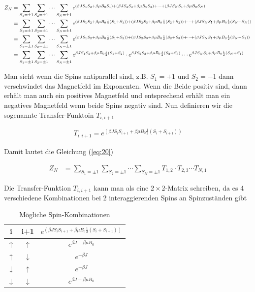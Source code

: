 \begin{align}
  \label{eq:20}
   Z_N &=\sum_{S_1=\pm 1}\sum_{S_2=\pm 1}\cdots \sum_{S_N=\pm 1} e^{(\beta J S_1 S_{2} + \beta \mu B_0 S_1) + (\beta J S_2 S_{3} + \beta \mu B_0 S_2) +\dots+ (\beta J S_N S_1 + \beta \mu B_0 S_N) } \notag\\
&=\sum_{S_1=\pm 1}\sum_{S_2=\pm 1}\cdots \sum_{S_N=\pm 1} e^{(\beta J S_1 S_{2} + \beta \mu B_0\frac{1}{2}(S_1+S_1)) + (\beta J S_2 S_{3} + \beta \mu B_0 \frac{1}{2}(S_2+S_2)) +\dots+ (\beta J S_N S_1 + \beta \mu B_0 \frac{1}{2}(S_N+S_N)) } \notag\\
&=\sum_{S_1=\pm 1}\sum_{S_2=\pm 1}\cdots \sum_{S_N=\pm 1} e^{(\beta J S_1 S_{2} + \beta \mu B_0\frac{1}{2}(S_1+S_2)) + (\beta J S_2 S_{3} + \beta \mu B_0 \frac{1}{2}(S_2+S_3)) +\dots+ (\beta J S_N S_1 + \beta \mu B_0 \frac{1}{2}(S_N+S_1)) } \notag\\
&=\sum_{S_1=\pm 1}\sum_{S_2=\pm 1}\cdots \sum_{S_N=\pm 1} e^{\beta J S_1 S_{2} + \beta \mu B_0\frac{1}{2}(S_1+S_2)}\cdot e^{\beta J S_2 S_{3} + \beta \mu B_0 \frac{1}{2}(S_2+S_3)}\cdots e^{\beta J S_N S_1 + \beta \mu B_0 \frac{1}{2}(S_N+S_1) } \notag\\
\end{align}

Man sieht wenn die Spins antiparallel sind, z.B. \(S_1=+1\) und \(S_2=-1\) dann verschwindet das Magnetfeld im Exponenten. Wenn die Beide positiv sind, dann erhält man auch ein positives Magnetfeld und entsprechend erhält man ein negatives Magnetfeld wenn beide Spins negativ sind.  Nun definieren wir die sogenannte Transfer-Funktoin \(T_{i,i+1}\)

\begin{align}
  \label{eq:21}
  T_{i,i+1}= e^{(\beta J S_i S_{i+1} + \beta \mu B_0\frac{1}{2}(S_i+S_{i+1}))}
\end{align}

Damit lautet die Gleichung (\ref{eq:20})

\begin{align}
  \label{eq:22}
   Z_N &=\sum_{S_1=\pm 1}\sum_{S_2=\pm 1}\cdots \sum_{S_N=\pm 1} T_{1,2}\cdot T_{2,3}\cdots T_{N,1}
\end{align}

Die Transfer-Funktion \(T_{i,i+1}\) kann man als eine \(2\times 2\)-Matrix schreiben, da es 4 verschiedene Kombinationen bei 2 interaggierenden Spins an Spinzuständen gibt

\begin{table}[h]
  \centering
  \begin{tabular}{ccc}
    i&i+1&\( e^{(\beta J S_i S_{i+1} + \beta \mu B_0\frac{1}{2}(S_i+S_{i+1}))} \) \\
\hline
\hline
    \(\uparrow\)&\(\uparrow\)& \( e^{\beta J  + \beta \mu B_0 } \)  \\
\hline
    \(\uparrow\)&\(\downarrow\)& \( e^{-\beta J } \)   \\
\hline
    \(\downarrow\)&\(\uparrow\)& \( e^{-\beta J } \)  \\
\hline
    \(\downarrow\)&\(\downarrow\)& \( e^{\beta J  - \beta \mu B_0 } \)
  \end{tabular}
  \caption{Mögliche Spin-Kombinationen}
  \label{tab:1}
\end{table}


